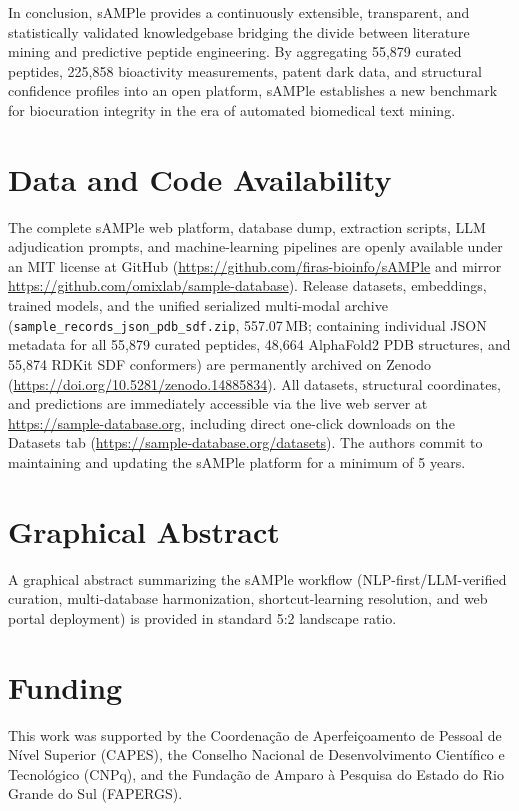 \documentclass[unnumsec,webpdf,contemporary,large]{oup-authoring-template}%
\begin{document}
In conclusion, sAMPle provides a continuously extensible, transparent, and statistically validated knowledgebase bridging the divide between literature mining and predictive peptide engineering. By aggregating 55,879 curated peptides, 225,858 bioactivity measurements, patent dark data, and structural confidence profiles into an open platform, sAMPle establishes a new benchmark for biocuration integrity in the era of automated biomedical text mining.

\section{Data and Code Availability}

The complete sAMPle web platform, database dump, extraction scripts, LLM adjudication prompts, and machine-learning pipelines are openly available under an MIT license at GitHub (\url{https://github.com/firas-bioinfo/sAMPle} and mirror \url{https://github.com/omixlab/sample-database}). Release datasets, embeddings, trained models, and the unified serialized multi-modal archive (\texttt{sample\_records\_json\_pdb\_sdf.zip}, 557.07\,MB; containing individual JSON metadata for all 55,879 curated peptides, 48,664 AlphaFold2 PDB structures, and 55,874 RDKit SDF conformers) are permanently archived on Zenodo (\url{https://doi.org/10.5281/zenodo.14885834}). All datasets, structural coordinates, and predictions are immediately accessible via the live web server at \url{https://sample-database.org}, including direct one-click downloads on the Datasets tab (\url{https://sample-database.org/datasets}). The authors commit to maintaining and updating the sAMPle platform for a minimum of 5 years.

\section*{Graphical Abstract}
A graphical abstract summarizing the sAMPle workflow (NLP-first/LLM-verified curation, multi-database harmonization, shortcut-learning resolution, and web portal deployment) is provided in standard 5:2 landscape ratio.

\section*{Funding}
This work was supported by the Coordena{\c{c}}{\~a}o de Aperfei{\c{c}}oamento de Pessoal de N{\'i}vel Superior (CAPES), the Conselho Nacional de Desenvolvimento Cient{\'i}fico e Tecnol{\'o}gico (CNPq), and the Funda{\c{c}}{\~a}o de Amparo {\`a} Pesquisa do Estado do Rio Grande do Sul (FAPERGS).
\end{document}
